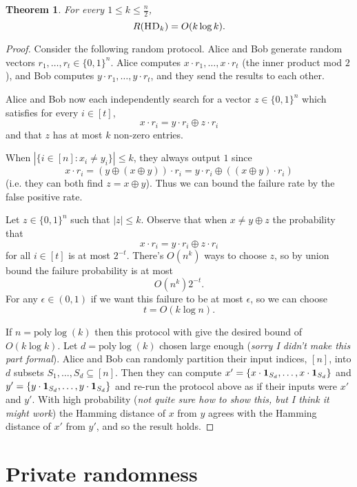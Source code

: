 \documentclass[11pt]{amsart}
\theoremstyle{plain}
\newtheorem{theorem}{Theorem}
\theoremstyle{definition}
\theoremstyle{plain}
\newcommand{\HD}{\textsc{HD}}
\begin{document}
\begin{theorem}
For every $1 \le k \le \frac n2$,
\[
R(\HD_k) = O( k \log k).
\]
\end{theorem}

\begin{proof}
Consider the following random protocol. Alice and Bob generate random vectors $r_1, \dots, r_t \in \{0,1\}^n.$ Alice computes $x\cdot r_1, \dots, x\cdot r_t$ (the inner product mod $2$), and Bob computes $y\cdot r_1, \dots, y \cdot r_t$, and they send the results to each other.

Alice and Bob now each independently search for a vector $z \in \{0,1\}^n$ which satisfies for every $i\in[t]$,
$$x\cdot r_i = y\cdot r_i \oplus z \cdot r_i$$
and that $z$ has at most $k$ non-zero entries.

When $|\{i \in [n]: x_i \neq y_i\}| \leq k$, they always output $1$ since 
$$x\cdot r_i = (y \oplus (x\oplus y)) \cdot r_i = y\cdot r_i \oplus((x\oplus y) \cdot r_i) $$ 
(i.e. they can both find $z= x\oplus y$). Thus we can bound the failure rate by the false positive rate.

Let $z \in \{0,1\}^n$ such that $|z| \leq k$. Observe that when $x \neq y \oplus z$ the probability that 
$$x\cdot r_i = y\cdot r_i \oplus z\cdot r_i$$
for all $i \in [t]$ is at most $2^{-t}$. There's $O(n^k)$ ways to choose $z$, so by union bound the failure probability is at most
$$O(n^k)2^{-t}.$$
For any $\epsilon \in (0,1)$ if we want this failure to be at most $\epsilon$, so we can choose
$$t = O(k \log n).$$

If $n = \text{poly}\log(k)$ then this protocol with give the desired bound of $O(k \log k)$. Let $d = \text{poly}\log(k)$ chosen large enough (\emph{sorry I didn't make this part formal}). Alice and Bob can randomly partition their input indices, $[n]$, into $d$ subsets $S_1, \dots, S_d\subseteq [n]$. Then they can compute $x'=\{x\cdot \bold{1}_{S_d},\dots, x\cdot \bold{1}_{S_d}\}$ and $y'=\{y\cdot \bold{1}_{S_d},\dots, y\cdot \bold{1}_{S_d}\}$ and re-run the protocol above as if their inputs were $x'$ and $y'$. With high probability (\emph{not quite sure how to show this, but I think it might work}) the Hamming distance of $x$ from $y$ agrees with the Hamming distance of $x'$ from $y'$, and so the result holds.
\end{proof}


\newpage 
\section{Private randomness}
\end{document}
